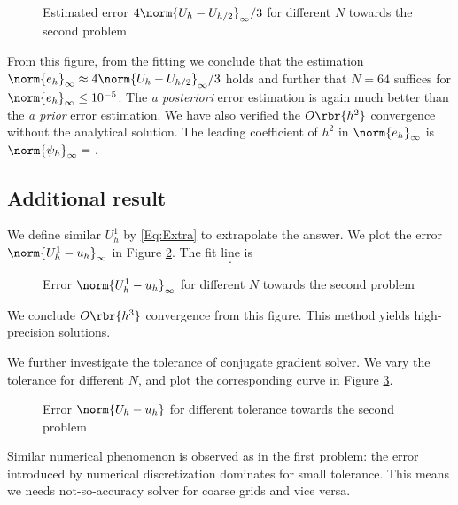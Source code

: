 \documentclass[english, nochinese]{pnote}
\newcommand\normi[1]{\norm{#1}_{\infty}}
\begin{document}
\begin{figure}[htbp]
\centering

\caption{Estimated error $ 4 \normi{ U_h - U_{ h / 2 } } / 3 $ for different $N$ towards the second problem}
\label{Fig:Prob2Post}
\end{figure}

From this figure, from the fitting we conclude that the estimation $ \normi{e_h} \approx 4 \normi{ U_h - U_{ h / 2 } } / 3 $ holds and further that $ N = 64 $ suffices for $ \normi{e_h} \le 10^{-5} $. The \textit{a posteriori} error estimation is again much better than the \textit{a prior} error estimation. We have also verified the $ O \rbr{h^2} $ convergence without the analytical solution. The leading coefficient of $h^2$ in $\normi{e_h}$ is $ \normi{\psi_h} = \text{} $.

\subsection{Additional result}

We define similar $U_h^1$ by \eqref{Eq:Extra} to extrapolate the answer. We plot the error $ \normi{ U_h^1 - u_h } $ in Figure \ref{Fig:Prob2Extra}. The fit line is
\begin{equation}
.
\end{equation}

\begin{figure}[htbp]
\centering

\caption{Error $ \normi{ U_h^1 - u_h } $ for different $N$ towards the second problem}
\label{Fig:Prob2Extra}
\end{figure}

We conclude $ O \rbr{h^3} $ convergence from this figure. This method yields high-precision solutions.

We further investigate the tolerance of conjugate gradient solver. We vary the tolerance for different $N$, and plot the corresponding curve in Figure \ref{Fig:Prob2Tol}.

\begin{figure}[htbp]
\centering

\caption{Error $ \norm{ U_h - u_h } $ for different tolerance towards the second problem}
\label{Fig:Prob2Tol}
\end{figure}

Similar numerical phenomenon is observed as in the first problem: the error introduced by numerical discretization dominates for small tolerance. This means we needs not-so-accuracy solver for coarse grids and vice versa.
\end{document}
